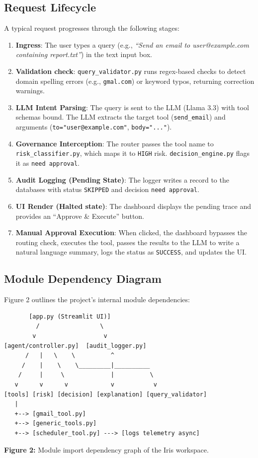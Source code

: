 \documentclass{article}
\begin{document}
\subsection{Request Lifecycle}
A typical request progresses through the following stages:
\begin{enumerate}
    \item \textbf{Ingress}: The user types a query (e.g., \textit{``Send an email to user@example.com containing report.txt''}) in the text input box.
    \item \textbf{Validation check}: \texttt{query\_validator.py} runs regex-based checks to detect domain spelling errors (e.g., \texttt{gmal.com}) or keyword typos, returning correction warnings.
    \item \textbf{LLM Intent Parsing}: The query is sent to the LLM (Llama 3.3) with tool schemas bound. The LLM extracts the target tool (\texttt{send\_email}) and arguments (\texttt{to="user@example.com"}, \texttt{body="..."}).
    \item \textbf{Governance Interception}: The router passes the tool name to \texttt{risk\_classifier.py}, which maps it to \texttt{HIGH} risk. \texttt{decision\_engine.py} flags it as \texttt{need approval}.
    \item \textbf{Audit Logging (Pending State)}: The logger writes a record to the databases with status \texttt{SKIPPED} and decision \texttt{need approval}.
    \item \textbf{UI Render (Halted state)}: The dashboard displays the pending trace and provides an ``Approve \& Execute'' button.
    \item \textbf{Manual Approval Execution}: When clicked, the dashboard bypasses the routing check, executes the tool, passes the results to the LLM to write a natural language summary, logs the status as \texttt{SUCCESS}, and updates the UI.
\end{enumerate}

\subsection{Module Dependency Diagram}
Figure 2 outlines the project's internal module dependencies:

\begin{verbatim}
       [app.py (Streamlit UI)]
         /                 \
        v                   v
[agent/controller.py]  [audit_logger.py]
      /   |   \    \          ^
     /    |    \    \_________|__________
    /     |     \             |          \
   v      v      v            v           v
[tools] [risk] [decision] [explanation] [query_validator]
   |
   +--> [gmail_tool.py]
   +--> [generic_tools.py]
   +--> [scheduler_tool.py] ---> [logs telemetry async]
\end{verbatim}
\begin{center}
\small \textbf{Figure 2:} Module import dependency graph of the Iris workspace.
\end{center}
\end{document}
